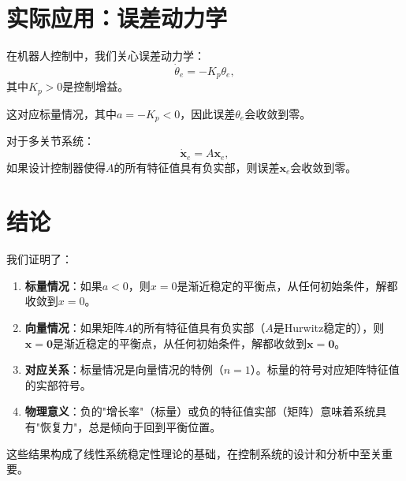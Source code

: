 \documentclass[12pt,a4paper]{article}
\begin{document}
\section{实际应用：误差动力学}

在机器人控制中，我们关心误差动力学：
\begin{equation}
\dot{\theta}_e = -K_p \theta_e,
\end{equation}
其中$K_p > 0$是控制增益。

这对应标量情况，其中$a = -K_p < 0$，因此误差$\theta_e$会收敛到零。

对于多关节系统：
\begin{equation}
\dot{\mathbf{x}}_e = A\mathbf{x}_e,
\end{equation}
如果设计控制器使得$A$的所有特征值具有负实部，则误差$\mathbf{x}_e$会收敛到零。

\section{结论}

我们证明了：

\begin{enumerate}
\item \textbf{标量情况}：如果$a < 0$，则$x = 0$是渐近稳定的平衡点，从任何初始条件，解都收敛到$x = 0$。

\item \textbf{向量情况}：如果矩阵$A$的所有特征值具有负实部（$A$是Hurwitz稳定的），则$\mathbf{x} = \mathbf{0}$是渐近稳定的平衡点，从任何初始条件，解都收敛到$\mathbf{x} = \mathbf{0}$。

\item \textbf{对应关系}：标量情况是向量情况的特例（$n = 1$）。标量的符号对应矩阵特征值的实部符号。

\item \textbf{物理意义}：负的"增长率"（标量）或负的特征值实部（矩阵）意味着系统具有"恢复力"，总是倾向于回到平衡位置。
\end{enumerate}

这些结果构成了线性系统稳定性理论的基础，在控制系统的设计和分析中至关重要。
\end{document}
